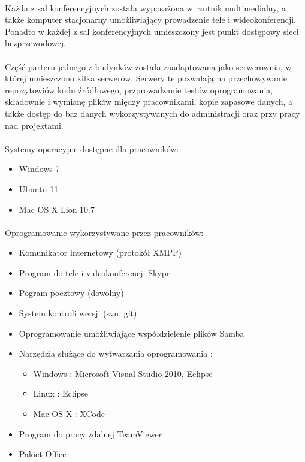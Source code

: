 \paragraph{}
Każda z sal konferencyjnych została wyposażona w rzutnik multimedialny, a także komputer stacjonarny umożliwiający prowadzenie tele i wideokonferencji.
Ponadto w każdej z sal konferencyjnych umieszczony jest punkt dostępowy sieci bezprzewodowej.

\paragraph{}
Część parteru jednego z budynków została zaadaptowana jako serwerownia, w której umieszczono kilka serwerów. Serwery te pozwalają na przechowywanie repozytowiów kodu źródłowego, przprowadzanie testów oprogramowania, składownie i wymianę plików między pracownikami, kopie zapasowe danych, a także dostęp do baz danych wykorzystywanych do administracji oraz przy pracy nad projektami.

\paragraph{}
Systemy operacyjne dostępne dla pracowników:
\begin{itemize}
  \item Windows 7
  \item Ubuntu 11
  \item Mac OS X Lion 10.7
\end{itemize}

\paragraph{}
Oprogramowanie wykorzystywane przez pracowników:
\begin{itemize}
  \item Komunikator internetowy (protokół XMPP)
  \item Program do tele i videokonferencji Skype
  \item Pogram pocztowy (dowolny)
  \item System kontroli wersji (svn, git)
  \item Oprogramowanie umożliwiające współdzielenie plików Samba
  \item Narzędzia służące do wytwarzania oprogramowania :
  \begin{itemize}
	\item Windows : Microsoft Visual Studio 2010, Eclipse
	\item Linux : Eclipse
	\item Mac OS X : XCode
  \end{itemize}
  \item Program do pracy zdalnej TeamViewer
 \item Pakiet Office
\end{itemize}






